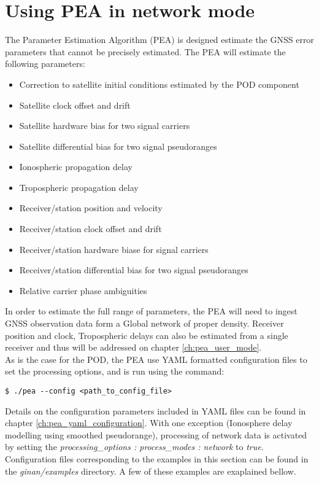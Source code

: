 \chapter{Using PEA in network mode}
\label{ch:pea_network_mode}
The Parameter Estimation Algorithm (PEA) is designed estimate the GNSS error parameters that cannot be precisely estimated. The PEA will estimate the following parameters:
\begin{itemize}
	\item Correction to satellite initial conditions estimated by the POD component
	\item Satellite clock offset and drift
	\item Satellite hardware bias for two signal carriers
	\item Satellite differential bias for two signal pseudoranges 
	\item Ionospheric propagation delay
	\item Tropospheric propagation delay
	\item Receiver/station position and velocity
	\item Receiver/station clock offset and drift
	\item Receiver/station hardware biase for signal carriers
	\item Receiver/station differential bias for two signal pseudoranges 
	\item Relative carrier phase ambiguities
\end{itemize}  
In order to estimate the full range of parameters, the PEA will need to ingest GNSS observation data form a Global network of proper density. Receiver position and clock, Tropospheric delays can also be estimated from a single receiver and thus will be addressed on chapter \ref{ch:pea_user_mode}.\\

As is the case for the POD, the PEA use YAML formatted configuration files to set the processing options, and is run using the command:
\begin{lstlisting}
$ ./pea --config <path_to_config_file>
\end{lstlisting}
Details on the configuration parameters included in YAML files can be found in chapter \ref{ch:pea_yaml_configuration}.
With one exception (Ionosphere delay modelling using smoothed pseudorange), processing of network data is activated by setting the \textit{ processing\_options : process\_modes : network} to \textit{true}.
Configuration files corresponding to the examples in this section can be found in the \textit{ginan/examples} directory. A few of these examples are exaplained bellow.\\

